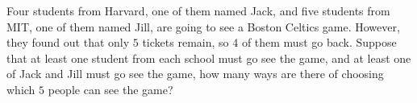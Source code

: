 Four students from Harvard, one of them named Jack, and five students from MIT, one of them named Jill, are going to see a Boston Celtics game. However, they found out that only $ 5$ tickets remain, so $ 4$ of them must go back. Suppose that at least one student from each school must go see the game, and at least one of Jack and Jill must go see the game, how many ways are there of choosing which $ 5$ people can see the game?